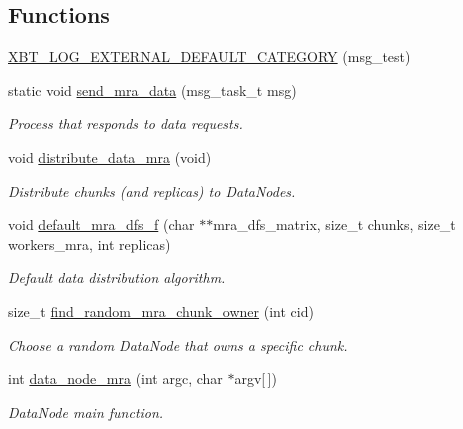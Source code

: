 \subsection*{\-Functions}
\begin{DoxyCompactItemize}
\item 
\hyperlink{dfs-mra_8c_a32bd1bae277b9aa336336310547bb693}{\-X\-B\-T\-\_\-\-L\-O\-G\-\_\-\-E\-X\-T\-E\-R\-N\-A\-L\-\_\-\-D\-E\-F\-A\-U\-L\-T\-\_\-\-C\-A\-T\-E\-G\-O\-R\-Y} (msg\-\_\-test)
\item 
static void \hyperlink{dfs-mra_8c_ada0444d4646937f1f59da2d5bd5cfad2}{send\-\_\-mra\-\_\-data} (msg\-\_\-task\-\_\-t msg)
\begin{DoxyCompactList}\small\item\em \-Process that responds to data requests. \end{DoxyCompactList}\item 
void \hyperlink{dfs-mra_8c_a23d972ed8df40ef6ff709f57e3944042}{distribute\-\_\-data\-\_\-mra} (void)
\begin{DoxyCompactList}\small\item\em \-Distribute chunks (and replicas) to \-Data\-Nodes. \end{DoxyCompactList}\item 
void \hyperlink{dfs-mra_8c_ac144b7da2b0cb2e76cf7226740c54dc1}{default\-\_\-mra\-\_\-dfs\-\_\-f} (char $\ast$$\ast$mra\-\_\-dfs\-\_\-matrix, size\-\_\-t chunks, size\-\_\-t workers\-\_\-mra, int replicas)
\begin{DoxyCompactList}\small\item\em \-Default data distribution algorithm. \end{DoxyCompactList}\item 
size\-\_\-t \hyperlink{dfs-mra_8c_a3f8eddb9dd6200115f7d88325537035e}{find\-\_\-random\-\_\-mra\-\_\-chunk\-\_\-owner} (int cid)
\begin{DoxyCompactList}\small\item\em \-Choose a random \-Data\-Node that owns a specific chunk. \end{DoxyCompactList}\item 
int \hyperlink{dfs-mra_8c_a86d9bef64a7e145c3e00de4e74e8d1c6}{data\-\_\-node\-\_\-mra} (int argc, char $\ast$argv\mbox{[}$\,$\mbox{]})
\begin{DoxyCompactList}\small\item\em \-Data\-Node main function. \end{DoxyCompactList}\end{DoxyCompactItemize}



